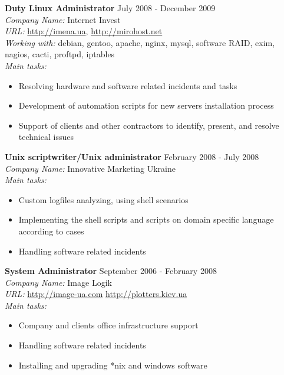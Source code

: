 \documentclass[mymargin,10pt]{res} %
\begin{document}
\begin{resume}
{\bf Duty Linux Administrator} \hfill July 2008 - December 2009 \\
{\sl Company Name:} Internet Invest \\
{\sl URL:} \url{http://imena.ua}, \url{http://mirohost.net}\\
{\sl Working with:} debian, gentoo, apache, nginx, mysql, software RAID, exim, nagios, cacti, proftpd,
iptables \\
{\sl Main tasks:}
\begin{itemize}
\item Resolving hardware and software related incidents and tasks
\item Development of automation scripts for new servers installation process
\item Support of clients and other contractors to identify, present, and resolve technical issues 
\end{itemize}

{\bf Unix scriptwriter/Unix administrator} \hfill February 2008 - July 2008 \\
{\sl Company Name:} Innovative Marketing Ukraine \\
{\sl Main tasks:}
\begin{itemize}
\item Custom logfiles analyzing, using shell scenarios
\item Implementing the shell scripts and scripts on domain specific language according to cases
\item Handling software related incidents
\end{itemize}

{\bf System Administrator} \hfill September 2006 - February 2008 \\
{\sl Company Name:} Image Logik \\
{\sl URL:} \url{http://image-ua.com} \url{http://plotters.kiev.ua} \\
{\sl Main tasks:}
\begin{itemize}
\item Company and clients office infrastructure support
\item Handling software related incidents
\item Installing and upgrading *nix and windows software
\end{itemize}



\end{resume}
\end{document}
